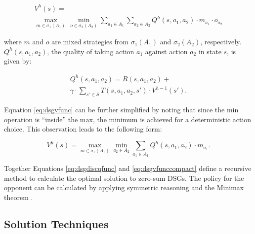 \vspace{-7.5mm}
{\small

\belowdisplayskip=0pt
\begin{multline}
\label{eq:dsgvfunc}
  V^{h}(s) = \\
  \max_{m \in \sigma_1(A_1)} \hspace{2pt} \min_{o \in \sigma_2(A_2)} \sum_{a_1 \in A_1} \sum_{a_2 \in A_2} Q^{h}(s, a_1, a_2) \cdot m_{a_{1}} \cdot o_{a_{2}}
\end{multline}
}%

where $m$ and $o$ are mixed strategies from $\sigma_1(A_1)$ and
$\sigma_2(A_2)$, respectively. $Q^{h}(s, a_1, a_2)$, the quality of taking action $a_1$ against action $a_2$ in state $s$,
is given by:

\vspace{-6.5mm}
{\small 
\belowdisplayskip=0pt
\begin{multline}
\label{eq:dsgdiscqfunc}
  Q^{h}(s, a_1, a_2) = R(s, a_1, a_2) + \\
  \gamma \cdot \sum_{s' \in S} T(s, a_1, a_2, s') \cdot V^{h-1}(s').
\end{multline}
}%

Equation \eqref{eq:dsgvfunc} can be further simplified by noting that
since the $\text{min}$ operation is ``inside'' the $\text{max}$, the minimum is achieved
for a deterministic action choice. This observation leads to the following
form:

\vspace{-6.5mm}
{\small 
\begin{equation}
\label{eq:dsgvfunccompact}
  V^{h}(s) = \max_{m \in \sigma_1(A_1)} \min_{a_2 \in A_2} \sum_{a_1 \in A_1} Q^{h}(s, a_1, a_2) \cdot m_{a_1}.
\end{equation}
}%
\vspace{-6.5mm}

Together Equations \eqref{eq:dsgdiscqfunc} and \eqref{eq:dsgvfunccompact}
define a recursive method to calculate the optimal solution to zero-sum
DSGs. The policy for the opponent can be calculated by applying symmetric
reasoning and the Minimax theorem \cite{Neumann_MA_1928}. 

\subsection{Solution Techniques}
\label{subsec:dsgsolution}

